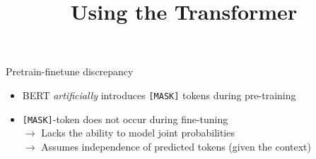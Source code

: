 



\newcommand{\titlefigure}{figure/bert.jpeg}
\newcommand{\learninggoals}{
\item Problem with the [MASK] token
\item Inter-token dependencies}

\title{Using the Transformer}
\date{}




\begin{frame}{Pretrain-finetune discrepancy}

	\begin{itemize}
		\item BERT \textit{artificially} introduces \texttt{[MASK]} tokens during pre-training
		\item \texttt{[MASK]}-token does not occur during fine-tuning\\
					$\rightarrow$ Lacks the ability to model joint probabilities\\
					$\rightarrow$ Assumes independence of predicted tokens (given the context)
	\end{itemize}
\end{frame}


